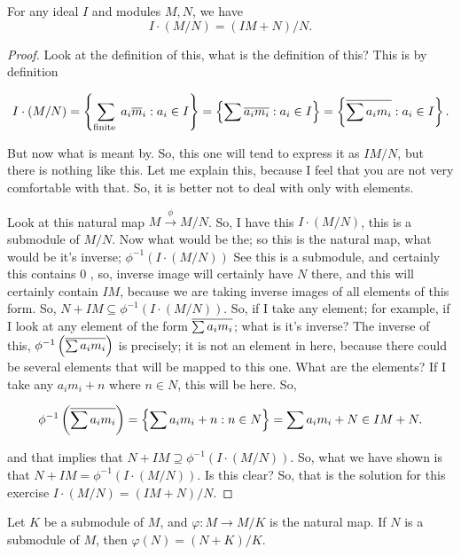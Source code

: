 \begin{exercise}\label{ex: ch3-5}
    For any ideal $I$ and modules $M,N$, we have
    \[I \cdot(M / N)=(I M+N) / N.\]
\end{exercise}
\begin{proof}
Look at the definition of this, what is the definition of this? This is by definition

$$
I \cdot(M / N)=\left\{\sum_{\text {finite }} a_{i} \overline{m}_{i}: a_{i} \in I\right\}=\left\{\sum \overline{a_{i} m_{i}}: a_{i} \in I\right\}=\left\{\overline{\sum a_{i} m_{i}}: a_{i} \in I\right\} .
$$

But now what is meant by. So, this one will tend to express it as $I M / N$, but there is nothing like this. Let me explain this, because I feel that you are not very comfortable with that. So, it is better not to deal with only with elements.

Look at this natural map $M \stackrel{\phi}{\longrightarrow} M / N$. So, I have this $I \cdot(M / N)$, this is a submodule of $M / N$. Now what would be the; so this is the natural map, what would be it's inverse; $\phi^{-1}(I \cdot(M / N))$ See this is a submodule, and certainly this contains 0 , so, inverse image will certainly have $N$ there, and this will certainly contain $I M$, because we are taking inverse images of all elements of this form. So, $N+I M \subseteq \phi^{-1}(I \cdot(M / N))$. So, if I take any element; for example, if I look at any element of the form $\overline{\sum a_{i} m_{i}}$; what is it's inverse? The inverse of this, $\phi^{-1}\left(\overline{\sum a_{i} m_{i}}\right)$ is precisely; it is not an element in here, because there could be several elements that will be mapped to this one. What are the elements? If I take any $a_{i} m_{i}+n$ where $n \in N$, this will be here. So,

$$
\phi^{-1}\left(\overline{\sum a_{i} m_{i}}\right)=\left\{\sum a_{i} m_{i}+n: n \in N\right\}=\sum a_{i} m_{i}+N \in I M+N .
$$

and that implies that $N+I M \supseteq \phi^{-1}(I \cdot(M / N))$. So, what we have shown is that $N+I M=\phi^{-1}(I \cdot(M / N))$. Is this clear? So, that is the solution for this exercise $I \cdot(M / N)=(I M+N) / N$.    
\end{proof}

\begin{exercise}\label{ex: ch3-6}
    Let $K$ be a submodule of $M$, and $\varphi: M \longrightarrow M / K$ is the natural map. If $N$ is a submodule of $M$, then $\varphi(N)=(N+K) / K$. 
\end{exercise}
\newpage

